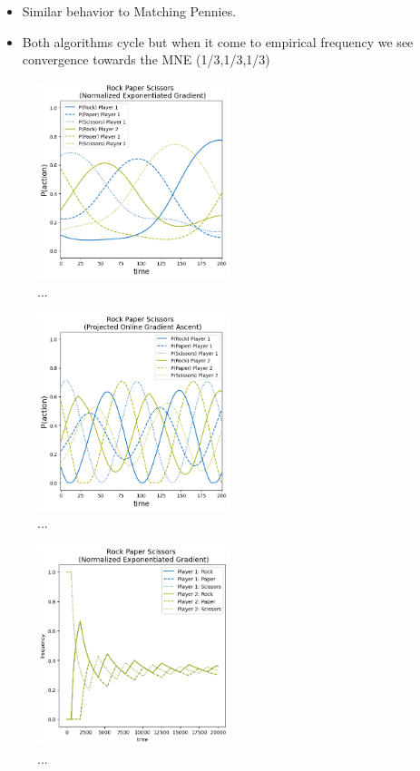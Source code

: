 \begin{itemize}
    \item Similar behavior to Matching Pennies. 
    \item Both algorithms cycle but when it come to empirical frequency we see convergence towards the MNE (1/3,1/3,1/3)
\end{itemize}

\begin{figure}
    \centering
    \includegraphics[width=0.5\textwidth]{logos/RPS1.png}
    \caption{...}
    \label{RPS1}
\end{figure}

\begin{figure}
    \centering
    \includegraphics[width=0.5\textwidth]{logos/RPS2.png}
    \caption{...}
    \label{RPS2}
\end{figure}

\begin{figure}
    \centering
    \includegraphics[width=0.5\textwidth]{logos/RPS3.png}
    \caption{...}
    \label{RPS3}
\end{figure}


